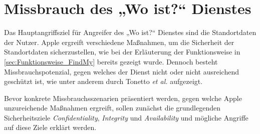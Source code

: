 \section{Missbrauch des „Wo ist?“ Dienstes}
\label{sec:Missbrauch}

Das Hauptangriffsziel für Angreifer des „Wo ist?“ Dienstes sind die Standortdaten der Nutzer.
Apple ergreift verschiedene Maßnahmen, um die Sicherheit der Standortdaten sicherzustellen, wie bei der Erläuterung der Funktionsweise in \autoref{sec:Funktionsweise_FindMy} bereits gezeigt wurde.
Dennoch besteht Missbrauchspotenzial, gegen welches der Dienst nicht oder nicht ausreichend geschützt ist, wie unter anderem durch Tonetto \textit{et al.} \cite{Tonetto_FindMy} aufgezeigt.

Bevor konkrete Missbrauchsszenarien präsentiert werden, gegen welche Apple unzureichende Maßnahmen ergreift, sollen zunächst die grundlegenden Sicherheitsziele \textit{Confidentiality}, \textit{Integrity} und \textit{Availability} und mögliche Angriffe auf diese Ziele erklärt werden.






